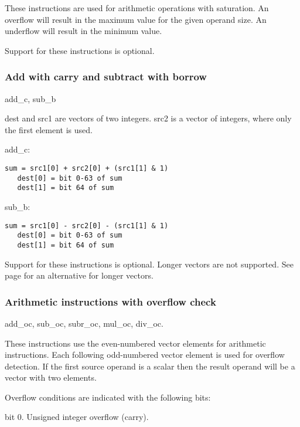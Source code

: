 \documentclass[forwardcom.tex]{subfiles}
\begin{document}
These instructions are used for arithmetic operations with saturation. An overflow will result in the maximum value for the given operand size. An underflow will result in the minimum value.
\vspace{2mm}

Support for these instructions is optional.

\subsubsection{Add with carry and subtract with borrow} \label{addWithCarryInstruction}
add\_c, sub\_b
\vspace{2mm}

dest and src1 are vectors of two integers. src2 is a vector of integers, where only the first element is used.
\vspace{2mm}

add\_c: 
\begin{lstlisting}[frame=none]
   sum = src1[0] + src2[0] + (src1[1] & 1)
   dest[0] = bit 0-63 of sum 
   dest[1] = bit 64 of sum
\end{lstlisting}

sub\_b:
\begin{lstlisting}[frame=none]
   sum = src1[0] - src2[0] - (src1[1] & 1)
   dest[0] = bit 0-63 of sum 
   dest[1] = bit 64 of sum
\end{lstlisting}

Support for these instructions is optional. Longer vectors are not supported. See page 
\pageref{highPrecisionArithmetic} for an alternative for longer vectors.

\subsubsection{Arithmetic instructions with overflow check} \label{instructionsWithOverflowCheck}
add\_oc, sub\_oc, subr\_oc, mul\_oc, div\_oc.
\vspace{2mm}

These instructions use the even-numbered vector elements for arithmetic instructions. Each following odd-numbered vector element is used for overflow detection. If the first source operand is a scalar then the result operand will be a vector with two elements.
\vspace{2mm}

Overflow conditions are indicated with the following bits:
\vspace{2mm}

bit 0. Unsigned integer overflow (carry).
\end{document}
